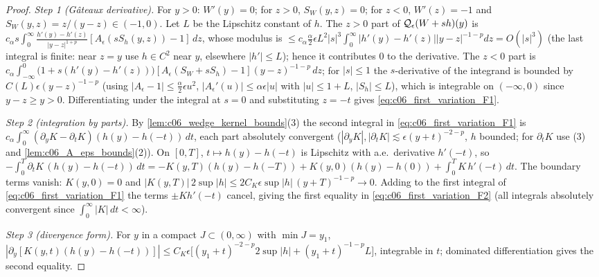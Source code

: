 \begin{proof}
  \emph{Step 1 (Gâteaux derivative).} For $y>0$: $W'(y)=0$; for $z>0$, $S_W(y,z)=0$; for $z<0$,
  $W'(z)=-1$ and $S_W(y,z)=z/(y-z)\in(-1,0)$. Let $L$ be the Lipschitz constant of $h$.
  The $z>0$ part of $\mathcal{Q}_\epsilon(W+sh)(y)$ is
  $c_\alpha s\int_0^\infty\frac{h'(y)-h'(z)}{|y-z|^{1+p}}[A_\epsilon(sS_h(y,z))-1]\,dz$, whose modulus is
  $\le c_\alpha\frac\alpha2\epsilon L^2|s|^3\int_0^\infty|h'(y)-h'(z)||y-z|^{-1-p}dz=O(|s|^3)$
  (the last integral is finite: near $z=y$ use $h\in C^2$ near $y$, elsewhere $|h'|\le L$); hence it
  contributes $0$ to the derivative. The $z<0$ part is
  $c_\alpha\int_{-\infty}^0\bigl(1+s(h'(y)-h'(z))\bigr)[A_\epsilon(S_W+sS_h)-1](y-z)^{-1-p}\,dz$; for $|s|\le1$
  the $s$-derivative of the integrand is bounded by $C(L)\epsilon(y-z)^{-1-p}$
  (using $|A_\epsilon-1|\le\frac\alpha2\epsilon u^2$, $|A_\epsilon'(u)|\le\alpha\epsilon|u|$ with $|u|\le 1+L$, $|S_h|\le L$),
  which is integrable on $(-\infty,0)$ since $y-z\ge y>0$. Differentiating under the integral at $s=0$ and
  substituting $z=-t$ gives \eqref{eq:c06_first_variation_F1}.

  \emph{Step 2 (integration by parts).} By \cref{lem:c06_wedge_kernel_bounds}(3) the second integral in
  \eqref{eq:c06_first_variation_F1} is $c_\alpha\int_0^\infty(\partial_yK-\partial_tK)(h(y)-h(-t))\,dt$, each part
  absolutely convergent ($|\partial_yK|,|\partial_tK|\lesssim\epsilon(y+t)^{-2-p}$, $h$ bounded; for $\partial_tK$ use (3)
  and \cref{lem:c06_A_eps_bounds}(2)). On $[0,T]$, $t\mapsto h(y)-h(-t)$ is Lipschitz with a.e.\ derivative $h'(-t)$, so
  $-\int_0^T\partial_tK\,(h(y)-h(-t))\,dt=-K(y,T)(h(y)-h(-T))+K(y,0)(h(y)-h(0))+\int_0^TK\,h'(-t)\,dt$.
  The boundary terms vanish: $K(y,0)=0$ and $|K(y,T)|\,2\sup|h|\le 2C_K\epsilon\sup|h|\,(y+T)^{-1-p}\to0$.
  Adding to the first integral of \eqref{eq:c06_first_variation_F1} the terms $\pm K h'(-t)$ cancel, giving the
  first equality in \eqref{eq:c06_first_variation_F2} (all integrals absolutely convergent since $\int_0^\infty|K|\,dt<\infty$).

  \emph{Step 3 (divergence form).} For $y$ in a compact $J\subset(0,\infty)$ with $\min J=y_1$,
  $|\partial_y[K(y,t)(h(y)-h(-t))]|\le C_K\epsilon\bigl[(y_1+t)^{-2-p}2\sup|h|+(y_1+t)^{-1-p}L\bigr]$,
  integrable in $t$; dominated differentiation gives the second equality.
\end{proof}

